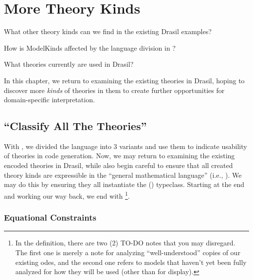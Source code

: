 \chapter{More Theory Kinds}
\label{chap:more-theory-kinds}

\begin{writingdirectives}
	\item What other theory kinds can we find in the existing Drasil examples?
	\item How is ModelKinds affected by the language division in
	      ?
	\item What theories currently are used in Drasil?
\end{writingdirectives}

In this chapter, we return to examining the existing theories in Drasil, hoping
to discover more \textit{kinds} of theories in them to create further
opportunities for domain-specific interpretation.

\section{\textquotedblleft{}Classify All The Theories\textquotedblright{}}
\label{chap:more-theory-kinds:sec:classify-all-the-theories}

With , we divided the \Expr{} language into 3 variants
and use them to indicate usability of theories in code generation. Now, we may
return to examining the existing encoded theories in Drasil, while also begin
careful to ensure that all created theory kinds are expressible in the ``general
mathematical language'' (i.e., \ModelExpr{}). We may do this by ensuring they
all instantiate the \Express{} () typeclass. Starting
at the end and working our way back, we end with
\footnote{In the 
definition, there are two (2) TO-DO notes that you may disregard. The first one
is merely a note for analyzing ``well-understood'' copies of our existing
\acsp{ode}, and the second one refers to models that haven't yet been fully
analyzed for how they will be used (other than for display).}.

\currentModelKindsHaskell{}

\subsection{Equational Constraints}
\label{chap:more-theory-kinds:sec:classify-all-the-theories:subsec:equational-constraints}



